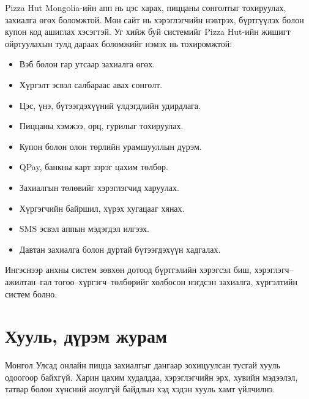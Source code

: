 Pizza Hut Mongolia-ийн апп нь цэс харах, пиццаны сонголтыг тохируулах, захиалга өгөх боломжтой. Мөн сайт нь хэрэглэгчийн нэвтрэх, бүртгүүлэх болон купон код ашиглах хэсэгтэй.
Уг хийж буй системийг Pizza Hut-ийн жишигт ойртуулахын тулд дараах боломжийг нэмэх нь тохиромжтой:

\begin{itemize}
    \item Вэб болон гар утсаар захиалга өгөх.
    \item Хүргэлт эсвэл салбараас авах сонголт.
    \item Цэс, үнэ, бүтээгдэхүүний үлдэгдлийн удирдлага.
    \item Пиццаны хэмжээ, орц, гурилыг тохируулах.
    \item Купон болон олон төрлийн урамшууллын дүрэм.
    \item QPay, банкны карт зэрэг цахим төлбөр.
    \item Захиалгын төлөвийг хэрэглэгчид харуулах.
    \item Хүргэгчийн байршил, хүрэх хугацааг хянах.
    \item SMS эсвэл аппын мэдэгдэл илгээх.
    \item Давтан захиалга болон дуртай бүтээгдэхүүн хадгалах.
\end{itemize}
Ингэснээр анхны систем зөвхөн дотоод бүртгэлийн хэрэгсэл биш, хэрэглэгч–ажилтан–гал тогоо–хүргэгч–төлбөрийг холбосон нэгдсэн захиалга, хүргэлтийн систем болно.

\section{Хууль, дүрэм журам}
Монгол Улсад онлайн пицца захиалгыг дангаар зохицуулсан тусгай хууль одоогоор байхгүй. Харин цахим худалдаа, хэрэглэгчийн эрх, хувийн мэдээлэл, татвар болон хүнсний аюулгүй байдлын хэд хэдэн хууль хамт үйлчилнэ.


